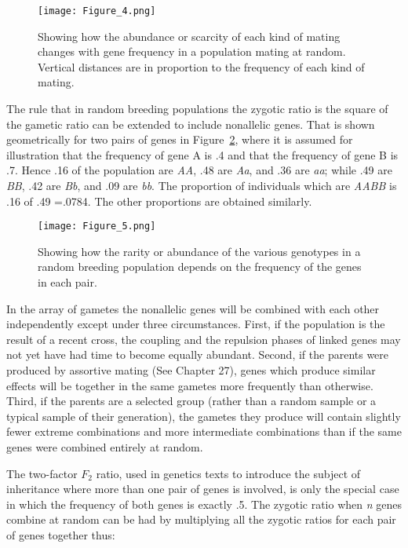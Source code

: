 \begin{figure}[htbp]
    \texttt{[image: Figure\_4.png]}
    \caption[justification=justified]{Showing how the abundance or scarcity of each kind of mating changes with gene frequency in a population mating at random. Vertical distances are in proportion to the frequency of each
    		 kind of mating.}
    \label{fig:Lush_Figure_4}
\end{figure}

The rule that in random breeding populations the zygotic ratio is the square of the gametic ratio can be
extended to include nonallelic genes. That is shown geometrically for two pairs of genes in
Figure~\ref{fig:Lush_Figure_5}, where it is assumed for illustration that the frequency of gene A is .4
and that the frequency of gene B is .7. Hence .16 of the population are \textit{AA}, .48 are \textit{Aa},
and .36 are \textit{aa}; while .49 are \textit{BB}, .42 are \textit{Bb}, and .09 are \textit{bb}. The
proportion of individuals which are \textit{AABB} is .16 of .49 =.0784. The other proportions are obtained
similarly.

\begin{figure}[htbp]
    \texttt{[image: Figure\_5.png]}
    \caption{Showing how the rarity or abundance of the various genotypes in a random breeding population
    	     depends on the frequency of the genes in each pair.}
    \label{fig:Lush_Figure_5}
\end{figure}

In the array of gametes the nonallelic genes will be combined with each other independently except under
three circumstances. First, if the population is the result of a recent cross, the
coupling and the
repulsion phases of linked genes may not yet have had time to become equally abundant. Second, if the
parents were produced by assortive mating (See Chapter 27), genes which produce similar
effects will be together in the same gametes more frequently than otherwise. Third, if the parents are a
selected group (rather than a random sample or a typical sample of their generation), the gametes they
produce will contain slightly fewer extreme combinations and more intermediate combinations than if the
same genes were combined entirely at random.

The two-factor $F_2$ ratio, used in genetics texts to introduce the subject of inheritance where more than
one pair of genes is involved, is only the special case in which the frequency of both genes is exactly .5.
The zygotic ratio when \textit{n} genes combine at random can be had by multiplying all the zygotic ratios
for each pair of genes together thus:

